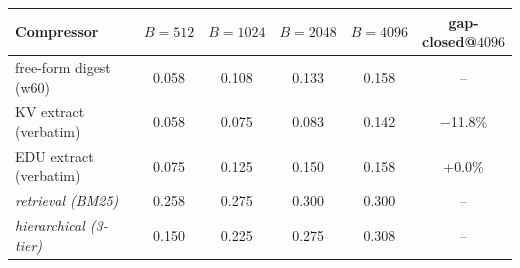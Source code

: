 \begin{tabular}{lccccc}
\toprule
Compressor & $B{=}512$ & $B{=}1024$ & $B{=}2048$ & $B{=}4096$ & gap-closed@$4096$ \\
\midrule
free-form digest (w60) & 0.058 & 0.108 & 0.133 & 0.158 & -- \\
KV extract (verbatim) & 0.058 & 0.075 & 0.083 & 0.142 & $-$11.8\% \\
EDU extract (verbatim) & 0.075 & 0.125 & 0.150 & 0.158 & +0.0\% \\
\midrule
\textit{retrieval (BM25)} & 0.258 & 0.275 & 0.300 & 0.300 & -- \\
\textit{hierarchical (3-tier)} & 0.150 & 0.225 & 0.275 & 0.308 & -- \\
\bottomrule
\end{tabular}